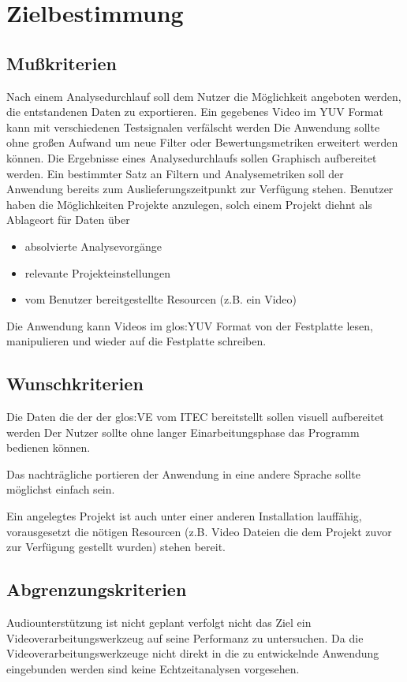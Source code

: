 \chapter{Zielbestimmung}

\section{Mußkriterien}

\newItemMK Nach einem Analysedurchlauf soll dem Nutzer die Möglichkeit angeboten werden, die entstandenen Daten zu exportieren. %
\newItemMK Ein gegebenes Video im YUV Format kann mit verschiedenen Testsignalen verfälscht werden %
\newItemMK Die Anwendung sollte ohne großen Aufwand um neue Filter oder Bewertungsmetriken erweitert werden können. %
\newItemMK Die Ergebnisse eines Analysedurchlaufs sollen Graphisch aufbereitet werden. %
\newItemMK Ein bestimmter Satz an Filtern und Analysemetriken soll der Anwendung bereits zum Auslieferungszeitpunkt zur Verfügung stehen.
\newItemMK Benutzer haben die Möglichkeiten Projekte anzulegen, solch einem Projekt diehnt als Ablageort für Daten über 
\begin{itemize}
\item absolvierte Analysevorgänge
\item relevante Projekteinstellungen
\item vom Benutzer bereitgestellte Resourcen (z.B. ein Video)
\end{itemize}
\newItemMK Die Anwendung kann Videos im \gls{glos:YUV} Format von der Festplatte lesen, manipulieren und wieder auf die Festplatte schreiben.


\setcounter{enumi}{0}

\section{Wunschkriterien}

\newItemWK Die Daten die der der \gls{glos:VE} vom \gls{ITEC}  bereitstellt sollen visuell aufbereitet werden
\newItemWK Der Nutzer sollte ohne langer Einarbeitungsphase das Programm bedienen können.

\newItemWK Das nachträgliche portieren der Anwendung in eine andere Sprache sollte möglichst einfach sein.

\newItemWK Ein angelegtes Projekt ist auch unter einer anderen \projektTitel Installation lauffähig, vorausgesetzt die nötigen Resourcen (z.B. Video Dateien die dem Projekt zuvor zur Verfügung gestellt wurden) stehen bereit.

\setcounter{enumi}{0}

\section{Abgrenzungskriterien}

\newItemAK Audiounterstützung ist nicht geplant
\newItemAK \projektTitel verfolgt nicht das Ziel ein Videoverarbeitungswerkzeug auf seine Performanz zu untersuchen.
\newItemAK Da die Videoverarbeitungswerkzeuge nicht direkt in die zu entwickelnde Anwendung eingebunden werden sind keine Echtzeitanalysen vorgesehen.


\setcounter{enumi}{0}
